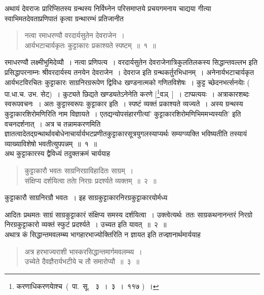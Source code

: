 \documentclass[11pt, openany]{book}
\begin{document}
\justifying
\indent
अथायं देवराजः प्रारिप्सितस्य ग्रन्थस्य निर्विघ्नेन परिसमाप्तये प्रचयगमनाय चाद्यया गीत्या स्वाभिमतदेवताप्रणिपातं कृत्वा ग्रन्थारम्भं प्रतिजानीत \textendash
\begin{quote}
\ks 
नत्वा रमाधरण्यौ वरदार्यसुतेन देवराजेन~।\\
आर्यभटाचार्यकृतः कुट्टाकारः प्रकाश्यते स्पष्टम्~॥~१~॥
\end{quote}

\indent
रमाधरण्यौ लक्ष्मीभुमिदेव्यौ~। नत्वा प्रणिपत्य~। वरदार्यसुतेन देवराजेनात्रिकुलतिलकस्य सिद्धान्तवल्लभ इति प्रसिद्धापरनाम्नः श्रीवरदार्यस्य तनयेन देवराजेन~। देवराज इति ग्रन्थकर्तुरभिधानम्~। अनेनार्यभटाचार्यकृत आर्यभटविरचितः कुट्टाकारः साग्रनिरग्ररूपेण द्विविधः खण्डनात्मको गणितविशेषः~। कुट्ट च्छेदनभर्त्सनयाेः ( पा.धा.च. उभ. सेट्)~। कुट्यते छिद्यते खण्ड्यतेऽनेनेति करणे [\renewcommand{\thefootnote}{*}\footnote{करणाधिकरणयाेश्च~(~पा.~सू. ~३~।~३~।~११७ )~।}वञ्~]~। टाप्प्रत्ययः~। अत्राकारशब्दः स्वरूपवचनः~। अतः कुट्टास्वरूपः कुट्टाकार इति~। स्पष्टं व्यक्तं प्रकाश्यते व्यज्यते~। अस्य ग्रन्थस्य कुट्टाकारशिरोमणिरिति नाम विज्ञायते~। एतद्यन्योपसंहारगीत्यां' कुट्टाकारशिरोमणिभिममभ्यस्यति' इति वचनदर्शनात्~। अत्र च तन्नामकरणमिति ज्ञातत्वादेतद्ग्रन्थार्थावबोधेनाचार्यार्यभटप्रणीतकुट्टाकारसूत्रयुगलस्याप्यर्थः सम्यग्व्यक्ति भविष्यतीति तस्यायं व्याख्याविशेषो भवतीत्युपपन्नम्~॥~१~॥\\

\noindent
अथ कुट्टाकारस्य द्वैविध्यं तदुक्तक्रमं चार्ययाह\textendash
\begin{quote}
\ks
कुट्टाकारौ भवतः साग्रनिरग्राविहादितः साग्रम्~।\\
संक्षिप्य दर्शयित्वा तताे निरग्रः प्रदर्श्यते व्यक्तम्~॥~२~॥
\end{quote}

\indent
कुट्टाकारौ साग्रनिरग्रौ भवतः~। इह साग्रकुट्टाकारनिरग्रकुट्टाकारयोर्मध्य
\newpage
\thispagestyle{fancy}
\fancyhf{}

\noindent
आदितः प्रथमतः साग्रं साग्रकुट्टाकारं संक्षिप्य समस्य दर्शयित्वा~। उक्त्वेत्यर्थः\textendash\ ततः साग्रकथनानन्तरं निरग्रो निरग्रकुट्टाकारो व्यक्तं स्फुटं प्रदर्श्यते~। उच्यत इति यावत्~॥~२~॥\\

\noindent
अथात्र कं सिद्धान्तमवलम्ब्य भागहारभाज्योक्तिरिति न ज्ञायत इति तज्ज्ञानार्थमार्ययाह\textendash
\begin{quote}
\ks
अत्र हरभाज्यराशी भास्करसिद्धान्तमार्गमवलम्ब्य~।\\
उच्येते दैवज्ञैरार्यभटीये च तौ समारोप्यौ~॥~३~॥
\end{quote}
\end{document}
